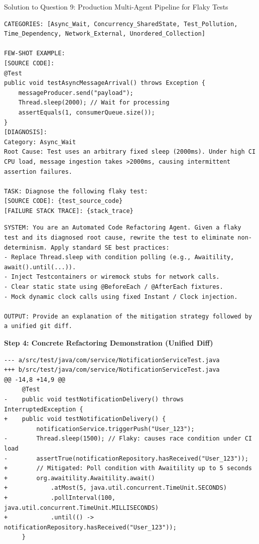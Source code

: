 \documentclass[11pt,a4paper]{article}
\begin{document}
\begin{solutionbox}{Solution to Question 9: Production Multi-Agent Pipeline for Flaky Tests}
\begin{lstlisting}[style=promptstyle, caption={Agent 2: Root-Cause Diagnosis System Prompt \& Few-Shot Template}]
CATEGORIES: [Async_Wait, Concurrency_SharedState, Test_Pollution, Time_Dependency, Network_External, Unordered_Collection]

FEW-SHOT EXAMPLE:
[SOURCE CODE]:
@Test
public void testAsyncMessageArrival() throws Exception {
    messageProducer.send("payload");
    Thread.sleep(2000); // Wait for processing
    assertEquals(1, consumerQueue.size());
}
[DIAGNOSIS]:
Category: Async_Wait
Root Cause: Test uses an arbitrary fixed sleep (2000ms). Under high CI CPU load, message ingestion takes >2000ms, causing intermittent assertion failures.

TASK: Diagnose the following flaky test:
[SOURCE CODE]: {test_source_code}
[FAILURE STACK TRACE]: {stack_trace}
\end{lstlisting}

\begin{lstlisting}[style=promptstyle, caption={Agent 3: Code Refactoring Agent System Prompt}]
SYSTEM: You are an Automated Code Refactoring Agent. Given a flaky test and its diagnosed root cause, rewrite the test to eliminate non-determinism. Apply standard SE best practices:
- Replace Thread.sleep with condition polling (e.g., Awaitility, await().until(...)).
- Inject Testcontainers or wiremock stubs for network calls.
- Clear static state using @BeforeEach / @AfterEach fixtures.
- Mock dynamic clock calls using fixed Instant / Clock injection.

OUTPUT: Provide an explanation of the mitigation strategy followed by a unified git diff.
\end{lstlisting}

\medskip
\noindent
\textbf{Step 4: Concrete Refactoring Demonstration (Unified Diff)}
\begin{lstlisting}[style=diffstyle]
--- a/src/test/java/com/service/NotificationServiceTest.java
+++ b/src/test/java/com/service/NotificationServiceTest.java
@@ -14,8 +14,9 @@
     @Test
-    public void testNotificationDelivery() throws InterruptedException {
+    public void testNotificationDelivery() {
         notificationService.triggerPush("User_123");
-        Thread.sleep(1500); // Flaky: causes race condition under CI load
-        assertTrue(notificationRepository.hasReceived("User_123"));
+        // Mitigated: Poll condition with Awaitility up to 5 seconds
+        org.awaitility.Awaitility.await()
+            .atMost(5, java.util.concurrent.TimeUnit.SECONDS)
+            .pollInterval(100, java.util.concurrent.TimeUnit.MILLISECONDS)
+            .until(() -> notificationRepository.hasReceived("User_123"));
     }
\end{lstlisting}


\end{solutionbox}
\end{document}
